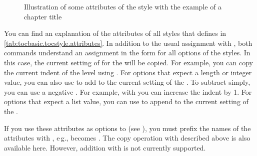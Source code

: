 \begin{description}
\begin{figure}
{%
    }
    \caption{Illustration of some attributes of the 
      style with the example of a chapter title}%
    \label{fig:tocbasic.undottedtocline}
  \end{figure}
\end{description}
You can find an explanation of the attributes of all styles that
 defines in \autoref{tab:tocbasic.tocstyle.attributes}.
In addition to the usual assignment with
, both commands understand an assignment in 
the form  for all options of the
\KOMAScript{} styles. In this case, the current setting of  for the
 will be copied. For example, you can copy the current
indent of the  level using . For
options that expect a length or integer value, you can also use
 to add  to the current setting
of the . To subtract simply, you can use a negative .
For example, with  you can increase the indent by
1. For options that expect a list value, you can use
 to append  to the current
setting of the .

If you use these attributes as
options to  (see
), you must prefix the names of the
attributes with , e\,g.,  becomes
. The copy operation with \Option{:=} described above is
also available here. However, addition with \Option{+=} is not currently
supported.

